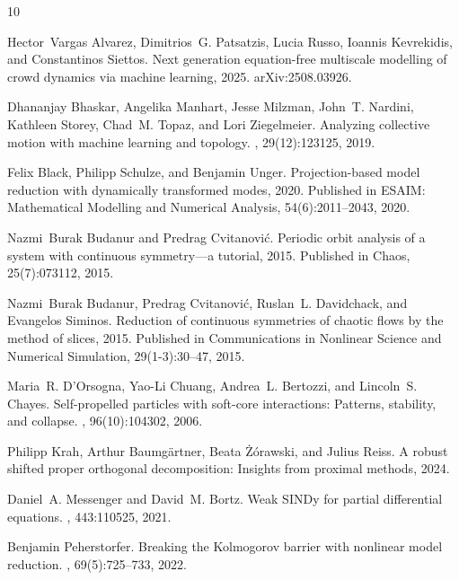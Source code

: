 \documentclass{report}
\theoremstyle{plain}
\theoremstyle{remark}
\numberwithin{equation}{section}              %
\begin{document}
%
\begin{thebibliography}{10}

Hector~Vargas Alvarez, Dimitrios~G. Patsatzis, Lucia Russo, Ioannis Kevrekidis,
  and Constantinos Siettos.
\newblock Next generation equation-free multiscale modelling of crowd dynamics
  via machine learning, 2025.
\newblock arXiv:2508.03926.

Dhananjay Bhaskar, Angelika Manhart, Jesse Milzman, John~T. Nardini, Kathleen
  Storey, Chad~M. Topaz, and Lori Ziegelmeier.
\newblock Analyzing collective motion with machine learning and topology.
, 29(12):123125, 2019.

Felix Black, Philipp Schulze, and Benjamin Unger.
\newblock Projection-based model reduction with dynamically transformed modes,
  2020.
\newblock Published in ESAIM: Mathematical Modelling and Numerical Analysis,
  54(6):2011--2043, 2020.

Nazmi~Burak Budanur and Predrag Cvitanovi{\'c}.
\newblock Periodic orbit analysis of a system with continuous symmetry---a
  tutorial, 2015.
\newblock Published in Chaos, 25(7):073112, 2015.

Nazmi~Burak Budanur, Predrag Cvitanovi{\'c}, Ruslan~L. Davidchack, and
  Evangelos Siminos.
\newblock Reduction of continuous symmetries of chaotic flows by the method of
  slices, 2015.
\newblock Published in Communications in Nonlinear Science and Numerical
  Simulation, 29(1-3):30--47, 2015.

Maria~R. D'Orsogna, Yao-Li Chuang, Andrea~L. Bertozzi, and Lincoln~S. Chayes.
\newblock Self-propelled particles with soft-core interactions: Patterns,
  stability, and collapse.
, 96(10):104302, 2006.

Philipp Krah, Arthur Baumg{\"a}rtner, Beata {\.Z}{\'o}rawski, and Julius Reiss.
\newblock A robust shifted proper orthogonal decomposition: Insights from
  proximal methods, 2024.

Daniel~A. Messenger and David~M. Bortz.
\newblock Weak {SINDy} for partial differential equations.
, 443:110525, 2021.

Benjamin Peherstorfer.
\newblock Breaking the {Kolmogorov} barrier with nonlinear model reduction.
, 69(5):725--733,
  2022.


\end{thebibliography}
\end{document}
